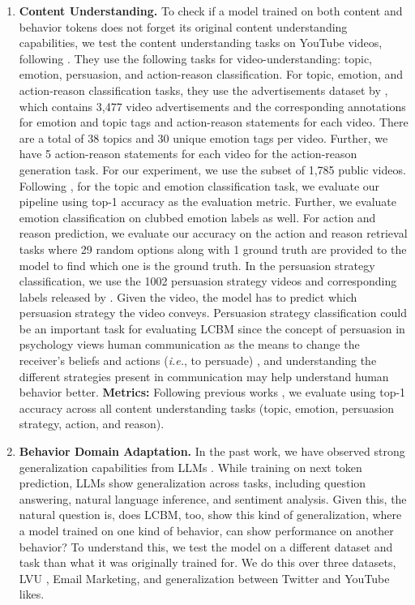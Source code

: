 \begin{enumerate}[leftmargin=*]
    \item\textbf{Content Understanding.} To check if a model trained on both content and behavior tokens does not forget its original content understanding capabilities, we test the content understanding tasks on YouTube videos, following \citet{bhattacharya2023video}. They use the following tasks for video-understanding: topic, emotion, persuasion, and action-reason classification. For topic, emotion, and action-reason classification tasks, they use the advertisements dataset by \citet{hussain2017automatic}, which contains 3,477 video advertisements and the corresponding annotations for emotion and topic tags and action-reason statements for each video. There are a total of 38 topics and 30 unique emotion tags per video. Further, we have 5 action-reason statements for each video for the action-reason generation task. For our experiment, we use the subset of 1,785 public videos.  Following \citet{bhattacharya2023video}, for the topic and emotion classification task, we evaluate our pipeline using top-1 accuracy as the evaluation metric. Further, we evaluate emotion classification on clubbed emotion labels as well. For action and reason prediction, we evaluate our accuracy on the action and reason retrieval tasks where 29 random options along with 1 ground truth are provided to the model to find which one is the ground truth.
    In the persuasion strategy classification, we use the 1002 persuasion strategy videos and corresponding labels released by \citet{bhattacharya2023video}. Given the video, the model has to predict which persuasion strategy the video conveys. Persuasion strategy classification could be an important task for evaluating LCBM since the concept of persuasion in psychology views human communication as the means to change the receiver's beliefs and actions (\textit{i.e.}, to persuade) \citep{kumar2023persuasion}, and understanding the different strategies present in communication may help understand human behavior better. \textbf{Metrics:} Following previous works \cite{bhattacharya2023video,kumar2023persuasion}, we evaluate using top-1 accuracy across all content understanding tasks (topic, emotion, persuasion strategy, action, and reason).
    
    \item\textbf{Behavior Domain Adaptation.} In the past work, we have observed strong generalization capabilities from LLMs \citep{openai2023gpt4,ouyang2022training,raffel2020exploring}. While training on next token prediction, LLMs show generalization across tasks, including question answering, natural language inference, and sentiment analysis. Given this, the natural question is, does LCBM, too, show this kind of generalization, where a model trained on one kind of behavior, can show performance on another behavior? To understand this, we test the model on a different dataset and task than what it was originally trained for. We do this over three datasets, LVU \citep{wu2021towards}, \companyName Email Marketing\footnotemark[6], and generalization between Twitter and YouTube likes.
    

\end{enumerate}
